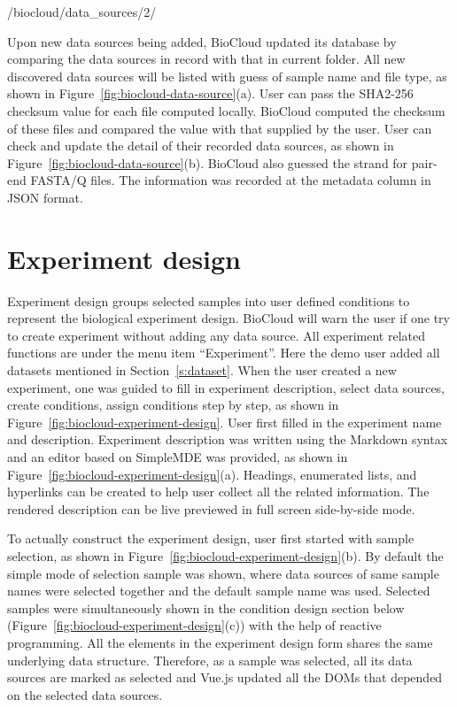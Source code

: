 \begin{CVerbatim}[fontsize=\small]
/biocloud/data_sources/2/
\end{CVerbatim}

\vspace{-1em}\noindent
Upon new data sources being added, BioCloud updated its database by comparing
the data sources in record with that in current folder. All new discovered data
sources will be listed with guess of sample name and file type, as shown in
Figure~\ref{fig:biocloud-data-source}(a). User can pass the SHA2-256 checksum
value for each file computed locally. BioCloud computed the checksum of these
files and compared the value with that supplied by the user. User can check and
update the detail of their recorded data sources, as shown in
Figure~\ref{fig:biocloud-data-source}(b). BioCloud also guessed the strand for
pair-end FASTA/Q files. The information was recorded at the metadata column in
JSON format.





\section{Experiment design}




Experiment design groups selected samples into user defined conditions to
represent the biological experiment design. BioCloud will warn the user if one
try to create experiment without adding any data source. All experiment related
functions are under the menu item ``Experiment''. Here the demo user added all
datasets mentioned in Section~\ref{s:dataset}. When the user created a new
experiment, one was guided to fill in experiment description, select data
sources, create conditions, assign conditions step by step, as shown in
Figure~\ref{fig:biocloud-experiment-design}. User first filled in the
experiment name and description. Experiment description was written using the
Markdown syntax and an editor based on SimpleMDE was provided, as shown in
Figure~\ref{fig:biocloud-experiment-design}(a). Headings, enumerated lists, and
hyperlinks can be created to help user collect all the related information. The
rendered description can be live previewed in full screen side-by-side mode.

To actually construct the experiment design, user first started with sample
selection, as shown in Figure~\ref{fig:biocloud-experiment-design}(b). By
default the simple mode of selection sample was shown, where data sources of
same sample names were selected together and the default sample name was used.
Selected samples were simultaneously shown in the condition design section
below (Figure~\ref{fig:biocloud-experiment-design}(c)) with the help of
reactive programming. All the elements in the experiment design form shares the
same underlying data structure. Therefore, as a sample was selected, all its
data sources are marked as selected and Vue.js updated all the DOMs that
depended on the selected data sources.

